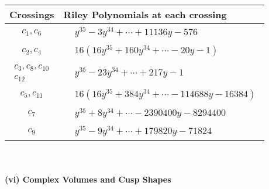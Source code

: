 \documentclass[1p]{elsarticle_modified}
\theoremstyle{definition}
\begin{document}
\begin{tabular}{m{50pt}|m{274pt}}
Crossings & \hspace{64pt}Riley Polynomials at each crossing \\
\hline $$\begin{aligned}c_{1},c_{6}\end{aligned}$$&$\begin{aligned}
&y^{35}-3 y^{34}+\cdots+11136 y-576
\end{aligned}$\\
\hline $$\begin{aligned}c_{2},c_{4}\end{aligned}$$&$\begin{aligned}
&16(16 y^{35}+160 y^{34}+\cdots-20 y-1)
\end{aligned}$\\
\hline $$\begin{aligned}c_{3},c_{8},c_{10}\\c_{12}\end{aligned}$$&$\begin{aligned}
&y^{35}-23 y^{34}+\cdots+217 y-1
\end{aligned}$\\
\hline $$\begin{aligned}c_{5},c_{11}\end{aligned}$$&$\begin{aligned}
&16(16 y^{35}+384 y^{34}+\cdots-114688 y-16384)
\end{aligned}$\\
\hline $$\begin{aligned}c_{7}\end{aligned}$$&$\begin{aligned}
&y^{35}+8 y^{34}+\cdots-2390400 y-8294400
\end{aligned}$\\
\hline $$\begin{aligned}c_{9}\end{aligned}$$&$\begin{aligned}
&y^{35}-9 y^{34}+\cdots+179820 y-71824
\end{aligned}$\\
\hline
\end{tabular}\\~\\
\newpage\flushleft \textbf{(vi) Complex Volumes and Cusp Shapes}
\end{document}
